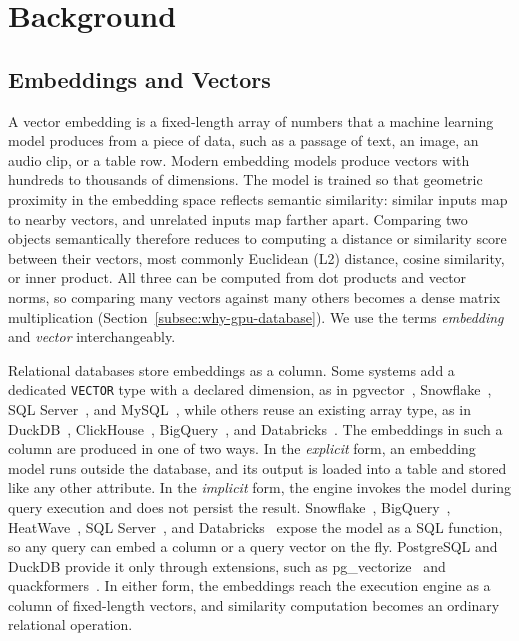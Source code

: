 \section{Background}\label{sec:background}


\subsection{Embeddings and Vectors}\label{subsec:embeddings-and-vectors}

A vector embedding is a fixed-length array of numbers that a machine learning model produces from a piece of data, such as a passage of text, an image, an audio clip, or a table row.
Modern embedding models produce vectors with hundreds to thousands of dimensions.
The model is trained so that geometric proximity in the embedding space reflects semantic similarity: similar inputs map to nearby vectors, and unrelated inputs map farther apart.
Comparing two objects semantically therefore reduces to computing a distance or similarity score between their vectors, most commonly Euclidean (L2) distance, cosine similarity, or inner product.
All three can be computed from dot products and vector norms, so comparing many vectors against many others becomes a dense matrix multiplication (Section~\ref{subsec:why-gpu-database}).
We use the terms \emph{embedding} and \emph{vector} interchangeably.

Relational databases store embeddings as a column.
Some systems add a dedicated \texttt{VECTOR} type with a declared dimension, as in pgvector~\cite{PgvectorRepo}, Snowflake~\cite{SnowflakeVector}, SQL Server~\cite{SQLServer2025Vector}, and MySQL~\cite{MySQLHeatWaveVector}, while others reuse an existing array type, as in DuckDB~\cite{DuckDBVSS}, ClickHouse~\cite{ClickHouseVSS}, BigQuery~\cite{BigQueryVectorSearchFn}, and Databricks~\cite{DatabricksNearestByJoinBlog26}.
The embeddings in such a column are produced in one of two ways.
In the \emph{explicit} form, an embedding model runs outside the database, and its output is loaded into a table and stored like any other attribute.
In the \emph{implicit} form, the engine invokes the model during query execution and does not persist the result.
Snowflake~\cite{SnowflakeAIEmbed}, BigQuery~\cite{BigQueryGenerateEmbedding}, HeatWave~\cite{HeatWaveMLEmbedRow}, SQL Server~\cite{SQLServerAIGenerateEmbeddings}, and Databricks~\cite{DatabricksAIQuery26} expose the model as a SQL function, so any query can embed a column or a query vector on the fly.
PostgreSQL and DuckDB provide it only through extensions, such as pg\_vectorize~\cite{PgVectorizeRepo} and quackformers~\cite{DuckDBQuackformers}.
In either form, the embeddings reach the execution engine as a column of fixed-length vectors, and similarity computation becomes an ordinary relational operation.

